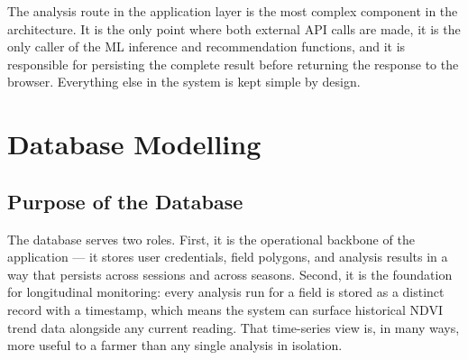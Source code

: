 \begin{figure}[H]
{%
}
\end{figure}

\noindent The analysis route in the application layer is the most complex component in the architecture. It is the only point where both external API calls are made, it is the only caller of the ML inference and recommendation functions, and it is responsible for persisting the complete result before returning the response to the browser. Everything else in the system is kept simple by design.

\section{Database Modelling}

\subsection*{Purpose of the Database}

The database serves two roles. First, it is the operational backbone of the application — it stores user credentials, field polygons, and analysis results in a way that persists across sessions and across seasons. Second, it is the foundation for longitudinal monitoring: every analysis run for a field is stored as a distinct record with a timestamp, which means the system can surface historical NDVI trend data alongside any current reading. That time-series view is, in many ways, more useful to a farmer than any single analysis in isolation. \citep{wolfert2017}

